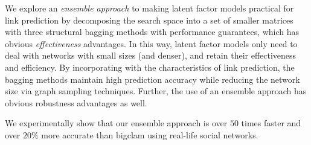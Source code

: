 We explore an {\em ensemble approach} to making latent factor models
practical for link prediction by decomposing the search space into a
 set of smaller matrices with three structural bagging methods with performance guarantees, which has obvious {\em
effectiveness} advantages. In this way, latent factor models only need to deal with networks with small sizes (and denser), and retain
their effectiveness and efficiency.  By incorporating with the characteristics of  link prediction, the bagging methods maintain high prediction
accuracy while reducing the network size via graph sampling techniques.
Further, the use of an ensemble
approach has obvious robustness advantages as well.


We experimentally show that our ensemble approach is over $50$ times faster and  over $20\%$ more accurate than {\sc bigclam} \cite{yang-wsdm2013} using real-life social networks.








